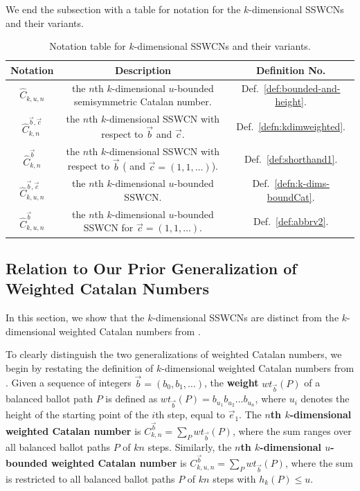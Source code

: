 \documentclass[11pt]{article}
\theoremstyle{remark}
\theoremstyle{definition}
\begin{document}
We end the subsection with a table for notation for the $k$-dimensional SSWCNs and their variants.
\begin{table}[H]
\centering
\begin{tabular}{|c|c|c|}
\hline Notation & Description & Definition No. \\ \hline
$\widehat{C}_{k, u, n}$& the $n$th $k$-dimensional $u$-bounded semisymmetric Catalan number. &  Def.~\ref{def:bounded-and-height}. \\  \hline $\widehat{C}_{k, n}^{\vec{b}, \vec{c}}$ &  the $n$th $k$-dimensional SSWCN with respect to $\vec{b}$ and $\vec{c}$. & Def.~\ref{defn:kdimweighted}.\\  \hline $\widehat{C}_{k, n}^{\vec{b}}$ &  the $n$th $k$-dimensional SSWCN with respect to $\vec{b}$ ( and $\vec{c}  = (1, 1, \dots)$). & Def.~\ref{def:shorthand1}. \\ \hline $\widehat{C}_{k, u, n}^{\vec{b},  \vec{c}}$ &  the $n$th $k$-dimensional $u$-bounded SSWCN. & Def.~\ref{defn:k-dims-boundCat}. \\ \hline $\widehat{C}_{k, u, n}^{\vec{b}}$ &  the $n$th $k$-dimensional $u$-bounded SSWCN for $\vec{c} = (1, 1, \dots)$. & Def.~\ref{def:abbrv2}. \\ \hline
\end{tabular}
\caption{Notation table for $k$-dimensional SSWCNs and their variants.}
\label{tab:notations}
\end{table}

\subsection{Relation to Our Prior Generalization of Weighted Catalan Numbers}\label{sec:Relation}
In this section, we show that the $k$-dimensional SSWCNs are distinct from the $k$-dimensional weighted Catalan numbers from \cite{MR5034574}.

To clearly distinguish the two generalizations of weighted Catalan numbers, we begin by restating the definition of $k$-dimensional weighted Catalan numbers from \cite{MR5034574}. Given a sequence of integers $\vec{b} = (b_0, b_1, \dots)$, the \textbf{weight} $wt_{\vec{b}}(P)$ of a balanced ballot path $P$ is defined as $wt_{\vec{b}}(P) = b_{u_1}b_{u_2}\dots b_{u_n}$, where $u_i$ denotes the height of the starting point of the $i$th step, equal to $\vec{e}_1$. The \textbf{$n$th $k$-dimensional weighted Catalan number} is $C_{k, n}^{\vec{b}}= \sum_{P}wt_{\vec{b}}(P)$, where the sum ranges over all balanced ballot paths $P$ of $kn$ steps. Similarly, the \textbf{$n$th $k$-dimensional $u$-bounded weighted Catalan number} is $C_{k, u, n}^{\vec{b}}= \sum_{P}wt_{\vec{b}}(P)$, where the sum is restricted to all balanced ballot paths $P$ of $kn$ steps with $h_k(P) \leq u$.
\end{document}

